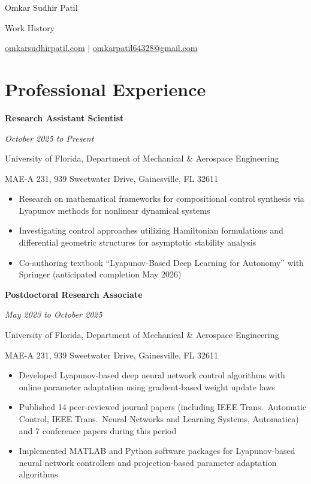 \documentclass[10pt, letterpaper]{article}
\begin{document}
\begin{center}
    {\LARGE Omkar Sudhir Patil}
    
    \vspace{0.1 cm}
    {\normalsize Work History}
    
    \vspace{0.05 cm}
    \href{https://omkarsudhirpatil.com}{omkarsudhirpatil.com} $|$ 
    \href{mailto:omkarpatil64328@gmail.com}{omkarpatil64328@gmail.com}
\end{center}

\vspace{0.3 cm}

\section{Professional Experience}

\vspace{0.15 cm}

\textbf{Research Assistant Scientist}

\textit{October 2025 to Present}

University of Florida, Department of Mechanical \& Aerospace Engineering

MAE-A 231, 939 Sweetwater Drive, Gainesville, FL 32611

\begin{itemize}[noitemsep]
    \item Research on mathematical frameworks for compositional control synthesis via Lyapunov methods for nonlinear dynamical systems
    \item Investigating control approaches utilizing Hamiltonian formulations and differential geometric structures for asymptotic stability analysis
    \item Co-authoring textbook ``Lyapunov-Based Deep Learning for Autonomy'' with Springer (anticipated completion May 2026)
\end{itemize}

\vspace{0.25 cm}

\textbf{Postdoctoral Research Associate}

\textit{May 2023 to October 2025}

University of Florida, Department of Mechanical \& Aerospace Engineering

MAE-A 231, 939 Sweetwater Drive, Gainesville, FL 32611

\begin{itemize}[noitemsep]
    \item Developed Lyapunov-based deep neural network control algorithms with online parameter adaptation using gradient-based weight update laws
    \item Published 14 peer-reviewed journal papers (including IEEE Trans.\ Automatic Control, IEEE Trans.\ Neural Networks and Learning Systems, Automatica) and 7 conference papers during this period
    \item Implemented MATLAB and Python software packages for Lyapunov-based neural network controllers and projection-based parameter adaptation algorithms
\end{itemize}
\end{document}

